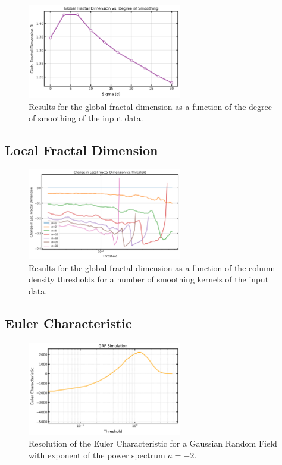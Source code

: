 \begin{figure}[h]
    \centering
    \includegraphics[width=0.6\textwidth]{figures/simulations_resolution_global_D.png}
    \caption{Results for the global fractal dimension as a function of the degree of smoothing of the input data.}
    \label{fig:sims_res_global}
\end{figure}

\subsection{Local Fractal Dimension}
\begin{figure}[h]
    \centering
    \includegraphics[width=0.6\textwidth]{figures/simulations_resolution_local_D.png}
    \caption{Results for the global fractal dimension as a function of the column density thresholds for a number of smoothing kernels of the input data.}
    \label{fig:sims_res_local}
\end{figure}

\newpage

\subsection{Euler Characteristic}
\begin{figure}[h]
    \centering
    \includegraphics[width=0.6\textwidth]{figures/simulations_euler_charact_GRF.png}
    \caption{Resolution of the Euler Characteristic for a Gaussian Random Field with exponent of the power spectrum $a = -2$.}
    \label{fig:sims_euler_char}
\end{figure}


